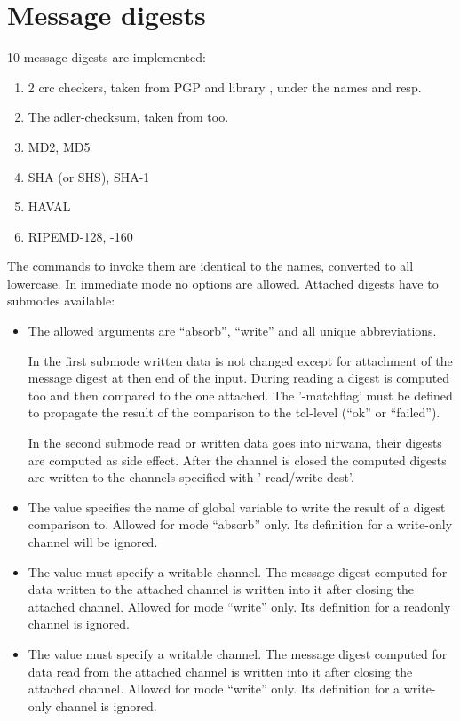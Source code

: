 \section {Message digests}

10 message digests are implemented:

\begin {enumerate}
\item	2 crc checkers, taken from PGP and library , under
	the names  and  resp.
\item	The adler-checksum, taken from  too.
\item	MD2, MD5
\item	SHA (or SHS), SHA-1
\item	HAVAL
\item	RIPEMD-128, -160
\end   {enumerate}

The commands to invoke them are identical to the names, converted to
all lowercase. In immediate mode no options are allowed. Attached
digests have to submodes available:

\begin {itemize}
\item[-mode]	The allowed arguments are ``absorb'', ``write'' and
		all unique abbreviations.

		In the first submode written data is not changed
		except for attachment of the message digest at then
		end of the input. During reading a digest is computed
		too and then compared to the one attached. The
		'-matchflag' must be defined to propagate the result
		of the comparison to the tcl-level (``ok'' or ``failed'').

		In the second submode read or written data goes into
		nirwana, their digests are computed as
		side effect. After the channel is closed the computed
		digests are written to the channels specified with
		'-read/write-dest'.

\item[-matchflag]	The value specifies the name of global
			variable to write the result of a digest
			comparison to. Allowed for mode ``absorb''
			only. Its definition for a write-only channel
			will be ignored.

\item[-write-dest]	The value must specify a writable channel. The
			message digest computed for data written to
			the attached channel is written into it after
			closing the attached channel. Allowed for mode
			``write'' only. Its definition for a readonly
			channel is ignored.

\item[-read-dest]	The value must specify a writable channel. The
			message digest computed for data read from
			the attached channel is written into it after
			closing the attached channel. Allowed for mode
			``write'' only. Its definition for a write-only
			channel is ignored.
\end   {itemize}


